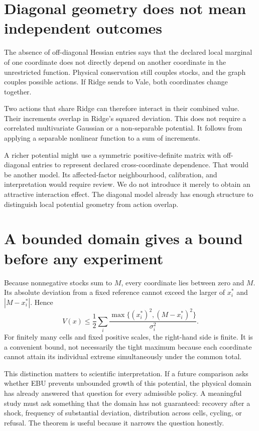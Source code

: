 \section{Diagonal geometry does not mean independent outcomes}
The absence of off-diagonal Hessian entries says that the declared local marginal of one coordinate does not directly depend on another coordinate in the unrestricted function. Physical conservation still couples stocks, and the graph couples possible actions. If Ridge sends to Vale, both coordinates change together.

Two actions that share Ridge can therefore interact in their combined value. Their increments overlap in Ridge's squared deviation. This does not require a correlated multivariate Gaussian or a non-separable potential. It follows from applying a separable nonlinear function to a sum of increments.

A richer potential might use a symmetric positive-definite matrix with off-diagonal entries to represent declared cross-coordinate dependence. That would be another model. Its affected-factor neighbourhood, calibration, and interpretation would require review. We do not introduce it merely to obtain an attractive interaction effect. The diagonal model already has enough structure to distinguish local potential geometry from action overlap.

\section{A bounded domain gives a bound before any experiment}
Because nonnegative stocks sum to \(M\), every coordinate lies between zero and \(M\). Its absolute deviation from a fixed reference cannot exceed the larger of \(x_i^*\) and \(|M-x_i^*|\). Hence
\begin{equation}
 V(x)\leq\frac12\sum_i
 \frac{\max\{(x_i^*)^2,(M-x_i^*)^2\}}{\sigma_i^2}.
\end{equation}
For finitely many cells and fixed positive scales, the right-hand side is finite. It is a convenient bound, not necessarily the tight maximum because each coordinate cannot attain its individual extreme simultaneously under the common total.

This distinction matters to scientific interpretation. If a future comparison asks whether EBU prevents unbounded growth of this potential, the physical domain has already answered that question for every admissible policy. A meaningful study must ask something that the domain has not guaranteed: recovery after a shock, frequency of substantial deviation, distribution across cells, cycling, or refusal. The theorem is useful because it narrows the question honestly.

